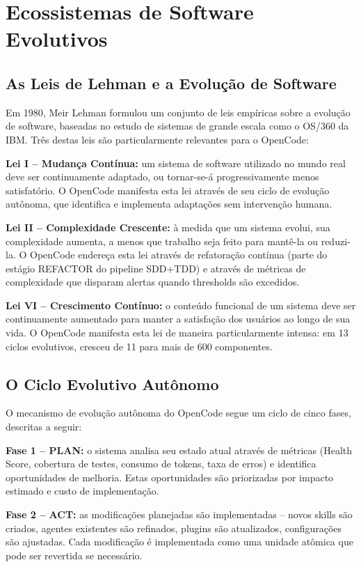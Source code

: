 \documentclass[12pt,a4paper,sumario=tradicional,openany]{abntex2}
\begin{document}
\section{Ecossistemas de Software Evolutivos}

\subsection{As Leis de Lehman e a Evolução de Software}

Em 1980, Meir Lehman formulou um conjunto de leis empíricas sobre a evolução de software, baseadas no estudo de sistemas de grande escala como o OS/360 da IBM. Três destas leis são particularmente relevantes para o OpenCode:

\textbf{Lei I -- Mudança Contínua:} um sistema de software utilizado no mundo real deve ser continuamente adaptado, ou tornar-se-á progressivamente menos satisfatório. O OpenCode manifesta esta lei através de seu ciclo de evolução autônoma, que identifica e implementa adaptações sem intervenção humana.

\textbf{Lei II -- Complexidade Crescente:} à medida que um sistema evolui, sua complexidade aumenta, a menos que trabalho seja feito para mantê-la ou reduzi-la. O OpenCode endereça esta lei através de refatoração contínua (parte do estágio REFACTOR do pipeline SDD+TDD) e através de métricas de complexidade que disparam alertas quando thresholds são excedidos.

\textbf{Lei VI -- Crescimento Contínuo:} o conteúdo funcional de um sistema deve ser continuamente aumentado para manter a satisfação dos usuários ao longo de sua vida. O OpenCode manifesta esta lei de maneira particularmente intensa: em 13 ciclos evolutivos, cresceu de 11 para mais de 600 componentes.

\subsection{O Ciclo Evolutivo Autônomo}

O mecanismo de evolução autônoma do OpenCode
segue um ciclo de cinco fases, descritas a seguir:

\textbf{Fase 1 -- PLAN:} o sistema analisa seu estado atual através de métricas (Health Score, cobertura de testes, consumo de tokens, taxa de erros) e identifica oportunidades de melhoria. Estas oportunidades são priorizadas por impacto estimado e custo de implementação.

\textbf{Fase 2 -- ACT:} as modificações planejadas são implementadas -- novos skills são criados, agentes existentes são refinados, plugins são atualizados, configurações são ajustadas. Cada modificação é implementada como uma unidade atômica que pode ser revertida se necessário.
\end{document}
